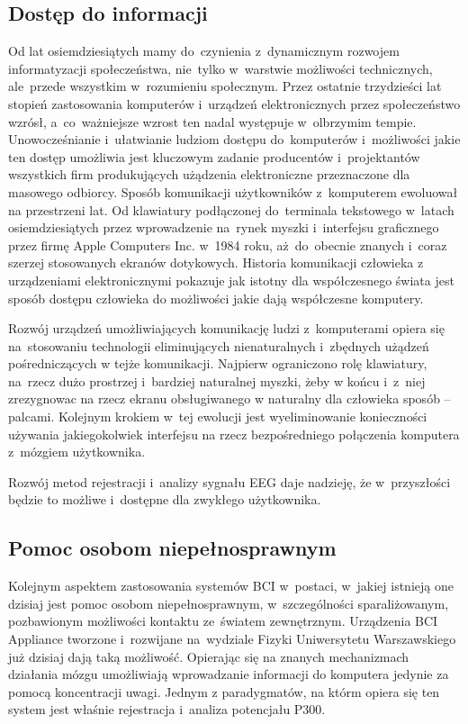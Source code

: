 \documentclass[licencjacka,openright]{pracamgr}
\begin{document}
\subsection{Dostęp do informacji}
Od lat osiemdziesiątych mamy do~czynienia z~dynamicznym rozwojem informatyzacji społeczeństwa, nie~tylko w~warstwie możliwości technicznych, ale~przede wszystkim w~rozumieniu społecznym. Przez ostatnie trzydzieści lat stopień zastosowania komputerów i~urządzeń elektronicznych przez społeczeństwo wzrósł, a~co~ważniejsze wzrost ten nadal występuje w~olbrzymim tempie. Unowocześnianie i~ułatwianie ludziom dostępu do~komputerów i~możliwości jakie ten dostęp umożliwia jest kluczowym zadanie producentów i~projektantów wszystkich firm produkujących użądzenia elektroniczne przeznaczone dla masowego odbiorcy. Sposób komunikacji użytkowników z~komputerem ewoluował na przestrzeni lat. Od klawiatury podłączonej do~terminala tekstowego w~latach osiemdziesiątych przez wprowadzenie na~rynek myszki i~interfejsu graficznego przez firmę Apple Computers Inc. w~1984 roku, aż~do~obecnie znanych i~coraz szerzej stosowanych ekranów dotykowych. Historia komunikacji człowieka z urządzeniami elektronicznymi pokazuje jak istotny dla współczesnego świata jest sposób dostępu człowieka do możliwości jakie dają współczesne komputery.

Rozwój urządzeń umożliwiających komunikację ludzi z~komputerami opiera się na~stosowaniu technologii eliminujących nienaturalnych i~zbędnych użądzeń pośredniczących w tejże komunikacji. Najpierw ograniczono rolę klawiatury, na~rzecz dużo prostrzej i~bardziej naturalnej myszki, żeby w końcu i~z~niej zrezygnowac na rzecz ekranu obsługiwanego w naturalny dla człowieka sposób -- palcami. Kolejnym krokiem w~tej ewolucji jest wyeliminowanie konieczności używania jakiegokolwiek interfejsu na rzecz bezpośredniego połączenia komputera z~mózgiem użytkownika.

Rozwój metod rejestracji i~analizy sygnału EEG daje nadzieję, że w~przyszłości będzie to możliwe i~dostępne dla zwykłego użytkownika.
\subsection{Pomoc osobom niepełnosprawnym}
Kolejnym aspektem zastosowania systemów BCI w~postaci, w~jakiej istnieją one dzisiaj jest pomoc osobom niepełnosprawnym, w~szczególności sparaliżowanym, pozbawionym możliwości kontaktu ze~światem zewnętrznym. Urządzenia BCI Appliance tworzone i~rozwijane na~wydziale Fizyki Uniwersytetu Warszawskiego już dzisiaj dają taką możliwość. Opierając się na znanych mechanizmach działania mózgu umożliwiają wprowadzanie informacji do komputera jedynie za pomocą koncentracji uwagi. Jednym z paradygmatów, na którm opiera się ten system jest właśnie rejestracja i~analiza potencjału P300.
\end{document}
